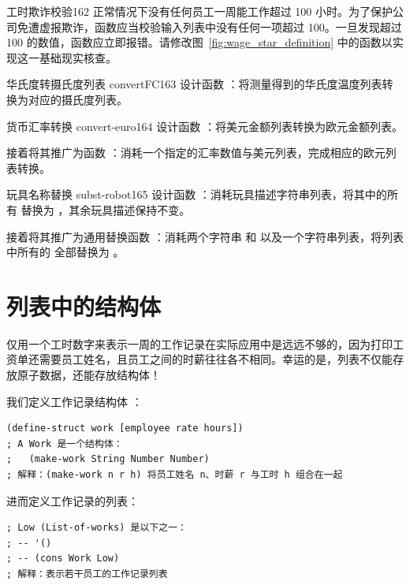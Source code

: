 \begin{exercise}{工时欺诈校验}{162}
正常情况下没有任何员工一周能工作超过 100 小时。为了保护公司免遭虚报欺诈，函数应当校验输入列表中没有任何一项超过 100。一旦发现超过 100 的数值，函数应立即报错。请修改图~\ref{fig:wage_star_definition} 中的函数以实现这一基础现实核查。
\end{exercise}

\begin{exercise}{华氏度转摄氏度列表 convertFC}{163}
设计函数 ：将测量得到的华氏度温度列表转换为对应的摄氏度列表。
\end{exercise}

\begin{exercise}{货币汇率转换 convert-euro}{164}
设计函数 ：将美元金额列表转换为欧元金额列表。

接着将其推广为函数 ：消耗一个指定的汇率数值与美元列表，完成相应的欧元列表转换。
\end{exercise}

\begin{exercise}{玩具名称替换 subst-robot}{165}
设计函数 ：消耗玩具描述字符串列表，将其中的所有  替换为 ，其余玩具描述保持不变。

接着将其推广为通用替换函数 ：消耗两个字符串  和  以及一个字符串列表，将列表中所有的  全部替换为 。
\end{exercise}

\section{列表中的结构体}
\label{sec:ch10_structures_in_lists}

仅用一个工时数字来表示一周的工作记录在实际应用中是远远不够的，因为打印工资单还需要员工姓名，且员工之间的时薪往往各不相同。幸运的是，列表不仅能存放原子数据，还能存放结构体！

我们定义工作记录结构体 ：
\begin{lstlisting}[language=BSL]
(define-struct work [employee rate hours])
; A Work 是一个结构体：
;   (make-work String Number Number)
; 解释：(make-work n r h) 将员工姓名 n、时薪 r 与工时 h 组合在一起
\end{lstlisting}

进而定义工作记录的列表：
\begin{lstlisting}[language=BSL]
; Low (List-of-works) 是以下之一：
; -- '()
; -- (cons Work Low)
; 解释：表示若干员工的工作记录列表
\end{lstlisting}

